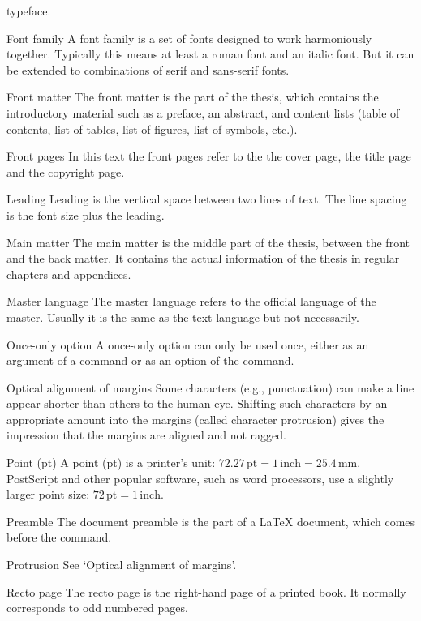 \begin{termlist}
  typeface.
\item[Font family]
  A font family is a set of fonts designed to work harmoniously together.
  Typically this means at least a roman font and an italic font. But it can
  be extended to combinations of serif and sans-serif fonts.
\item[Front matter]
  The front matter is the part of the thesis, which contains the
  introductory material such as a preface, an abstract, and content lists
  (table of contents, list of tables, list of figures, list of symbols, etc.).
\item[Front pages]
  In this text the front pages refer to the the cover page, the title page
  and the copyright page.
\item[Leading]
  Leading is the vertical space between two lines of text. The line spacing
  is the font size plus the leading.
\item[Main matter]
  The main matter is the middle part of the thesis, between the front and
  the back matter. It contains the actual information of the thesis in
  regular chapters and appendices.
\item[Master language]
  The master language refers to the official language of the master.
  Usually it is the same as the text language but not necessarily.
\item[Once-only option \latex]
  A once-only option can only be used once, either as an argument of a
   command or as an option of the  command.
\item[Optical alignment of margins]
  Some characters (e.g., punctuation) can make a line appear shorter than
  others to the human eye. Shifting such characters by an appropriate
  amount into the margins (called character protrusion) gives the impression
  that the margins are aligned and not ragged.
\item[Point (pt)]
  A point (pt) is a printer's unit: $72.27\,\mathrm{pt} = 1\,\mathrm{inch} =
  25.4\,\mathrm{mm}$. PostScript and other popular software, such as word
  processors, use a slightly larger point size: $72\,\mathrm{pt} =
  1\,\mathrm{inch}$.
\item[Preamble \latex]
  The document preamble is the part of a LaTeX document, which comes before
  the \verb"" command.
\item[Protrusion]
  See `Optical alignment of margins'.
\item[Recto page]
  The recto page is the right-hand page of a printed book. It normally
  corresponds to odd numbered pages.

\end{termlist}
